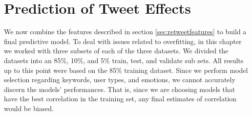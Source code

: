 \section{Prediction of Tweet Effects}
\label{sec:predictall}
We now combine the features described in section \ref{sec:retweetfeatures} to build a final predictive model. To deal with issues related to overfitting, in this chapter we worked with three subsets of each of the three datasets. We divided the datasets into an 85\%, 10\%, and 5\% train, test, and validate sub sets. All results up to this point were based on the 85\% training dataset. Since we perform model selection regarding keywords, user types, and emotions, we cannot accurately discern the models' performances. That is, since we are choosing models that have the best correlation in the training set, any final estimates of correlation would be biased. 


